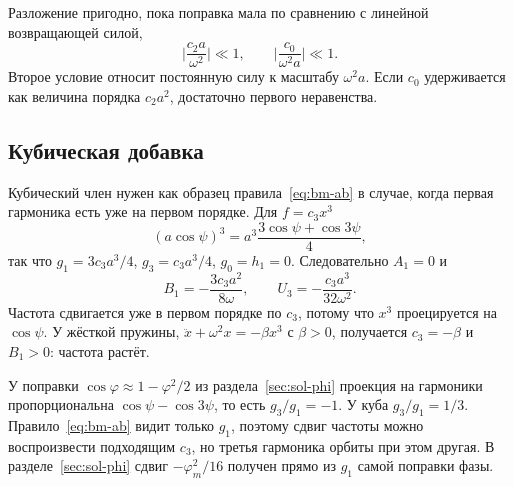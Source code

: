 Разложение пригодно, пока поправка мала по сравнению с линейной возвращающей силой,
\begin{equation}
\label{eq:bm-valid}
\biggl|\frac{c_2 a}{\omega^2}\biggr|\ll 1,
\qquad
\biggl|\frac{c_0}{\omega^2 a}\biggr|\ll 1.
\end{equation}
Второе условие относит постоянную силу к масштабу $\omega^2 a$. Если $c_0$ удерживается как величина порядка $c_2 a^2$, достаточно первого неравенства.

\subsection{Кубическая добавка}
\label{sec:bm-cubic}

Кубический член нужен как образец правила~\eqref{eq:bm-ab} в случае, когда первая гармоника есть уже на первом порядке. Для $f=c_3 x^3$
\begin{equation}
\label{eq:bm-cubic-f}
(a\cos\psi)^3=a^3\frac{3\cos\psi+\cos 3\psi}{4},
\end{equation}
так что $g_1=3c_3 a^3/4$, $g_3=c_3 a^3/4$, $g_0=h_1=0$. Следовательно $A_1=0$ и
\begin{equation}
\label{eq:bm-cubic-b}
B_1=-\frac{3c_3 a^2}{8\omega},
\qquad
U_3=-\frac{c_3 a^3}{32\omega^2}.
\end{equation}
Частота сдвигается уже в первом порядке по $c_3$, потому что $x^3$ проецируется на $\cos\psi$. У жёсткой пружины, $\ddot x+\omega^2 x=-\beta x^3$ с $\beta>0$, получается $c_3=-\beta$ и $B_1>0$: частота растёт.

У поправки $\cos\varphi\approx 1-\varphi^2/2$ из раздела~\ref{sec:sol-phi} проекция на гармоники пропорциональна $\cos\psi-\cos 3\psi$, то есть $g_3/g_1=-1$. У куба $g_3/g_1=1/3$. Правило~\eqref{eq:bm-ab} видит только $g_1$, поэтому сдвиг частоты можно воспроизвести подходящим $c_3$, но третья гармоника орбиты при этом другая. В разделе~\ref{sec:sol-phi} сдвиг $-\varphi_m^2/16$ получен прямо из $g_1$ самой поправки фазы.
